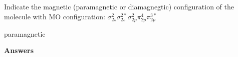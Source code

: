 \documentclass[main.tex]{subfiles}
\begin{document}
\begin{multicols*}{2}
\begin{question}[ID=\the\value{numA}]
Indicate the magnetic (paramagnetic or diamagnegtic) configuration of the molecule with MO configuration: $\sigma^{2}_{2s}\sigma^{2*}_{2s} \sigma^{2}_{2p}\pi^{4}_{2p}\pi^{3*}_{2p}$
\end{question}
\begin{solution} 
 paramagnetic\hspace{0.1cm}\end{solution}

 
\end{multicols*}
\newpage
\begin{answersenvironment}
\begin{minipage}[c]{1\textwidth}
\begin{localsize}{10}
{\Large \bf Answers}
\printsolutions[byID={1,3,5,7,9,11,13}]
\end{localsize}
\end{minipage}\end{answersenvironment}
\end{document}
